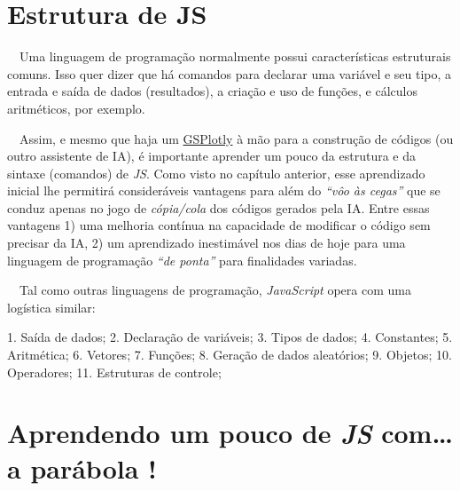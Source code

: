 \documentclass[
  portuguese,
  letterpaper,
  DIV=11,
  numbers=noendperiod]{scrreprt}
\newenvironment{Shaded}{\begin{snugshade}}{\end{snugshade}}
\newcommand{\FloatTok}[1]{\textcolor[rgb]{0.68,0.00,0.00}{#1}}
\newcommand{\NormalTok}[1]{\textcolor[rgb]{0.00,0.23,0.31}{#1}}
\newcommand{\OperatorTok}[1]{\textcolor[rgb]{0.37,0.37,0.37}{#1}}
\begin{document}
\section{Estrutura de JS}\label{estrutura-de-js}

~~Uma linguagem de programação normalmente possui características
estruturais comuns. Isso quer dizer que há comandos para declarar uma
variável e seu tipo, a entrada e saída de dados (resultados), a criação
e uso de funções, e cálculos aritméticos, por exemplo.

~~Assim, e mesmo que haja um
\href{https://chatgpt.com/g/g-6819fbb8d2d08191bf7d50a3dbeadb0d-gsplotly}{GSPlotly}
à mão para a construção de códigos (ou outro assistente de IA), é
importante aprender um pouco da estrutura e da sintaxe (comandos) de
\emph{JS}. Como visto no capítulo anterior, esse aprendizado inicial lhe
permitirá consideráveis vantagens para além do \emph{``vôo às cegas''}
que se conduz apenas no jogo de \emph{cópia/cola} dos códigos gerados
pela IA. Entre essas vantagens 1) uma melhoria contínua na capacidade de
modificar o código sem precisar da IA, 2) um aprendizado inestimável nos
dias de hoje para uma linguagem de programação \emph{``de ponta''} para
finalidades variadas.

~~Tal como outras linguagens de programação, \emph{JavaScript} opera com
uma logística similar:

\begin{Shaded}
\begin{Highlighting}[]
\FloatTok{1.}\NormalTok{ Saída de dados}\OperatorTok{;}
\FloatTok{2.}\NormalTok{ Declaração de variáveis}\OperatorTok{;} 
\FloatTok{3.}\NormalTok{ Tipos de dados}\OperatorTok{;}
\FloatTok{4.}\NormalTok{ Constantes}\OperatorTok{;}
\FloatTok{5.}\NormalTok{ Aritmética}\OperatorTok{;}
\FloatTok{6.}\NormalTok{ Vetores}\OperatorTok{;}
\FloatTok{7.}\NormalTok{ Funções}\OperatorTok{;}
\FloatTok{8.}\NormalTok{ Geração de dados aleatórios}\OperatorTok{;}
\FloatTok{9.}\NormalTok{ Objetos}\OperatorTok{;}
\FloatTok{10.}\NormalTok{ Operadores}\OperatorTok{;}
\FloatTok{11.}\NormalTok{ Estruturas de controle}\OperatorTok{;}
\end{Highlighting}
\end{Shaded}

\section{\texorpdfstring{Aprendendo um pouco de \emph{JS} com\ldots a
parábola
!}{Aprendendo um pouco de JS com\ldots a parábola !}}\label{aprendendo-um-pouco-de-js-coma-paruxe1bola}
\end{document}
